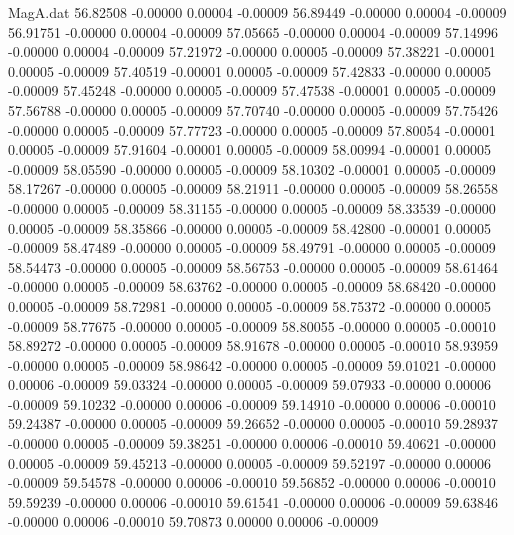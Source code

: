 \begin{filecontents}{MagA.dat}
  56.82508   -0.00000    0.00004   -0.00009
  56.89449   -0.00000    0.00004   -0.00009
  56.91751   -0.00000    0.00004   -0.00009
  57.05665   -0.00000    0.00004   -0.00009
  57.14996   -0.00000    0.00004   -0.00009
  57.21972   -0.00000    0.00005   -0.00009
  57.38221   -0.00001    0.00005   -0.00009
  57.40519   -0.00001    0.00005   -0.00009
  57.42833   -0.00000    0.00005   -0.00009
  57.45248   -0.00000    0.00005   -0.00009
  57.47538   -0.00001    0.00005   -0.00009
  57.56788   -0.00000    0.00005   -0.00009
  57.70740   -0.00000    0.00005   -0.00009
  57.75426   -0.00000    0.00005   -0.00009
  57.77723   -0.00000    0.00005   -0.00009
  57.80054   -0.00001    0.00005   -0.00009
  57.91604   -0.00001    0.00005   -0.00009
  58.00994   -0.00001    0.00005   -0.00009
  58.05590   -0.00000    0.00005   -0.00009
  58.10302   -0.00001    0.00005   -0.00009
  58.17267   -0.00000    0.00005   -0.00009
  58.21911   -0.00000    0.00005   -0.00009
  58.26558   -0.00000    0.00005   -0.00009
  58.31155   -0.00000    0.00005   -0.00009
  58.33539   -0.00000    0.00005   -0.00009
  58.35866   -0.00000    0.00005   -0.00009
  58.42800   -0.00001    0.00005   -0.00009
  58.47489   -0.00000    0.00005   -0.00009
  58.49791   -0.00000    0.00005   -0.00009
  58.54473   -0.00000    0.00005   -0.00009
  58.56753   -0.00000    0.00005   -0.00009
  58.61464   -0.00000    0.00005   -0.00009
  58.63762   -0.00000    0.00005   -0.00009
  58.68420   -0.00000    0.00005   -0.00009
  58.72981   -0.00000    0.00005   -0.00009
  58.75372   -0.00000    0.00005   -0.00009
  58.77675   -0.00000    0.00005   -0.00009
  58.80055   -0.00000    0.00005   -0.00010
  58.89272   -0.00000    0.00005   -0.00009
  58.91678   -0.00000    0.00005   -0.00010
  58.93959   -0.00000    0.00005   -0.00009
  58.98642   -0.00000    0.00005   -0.00009
  59.01021   -0.00000    0.00006   -0.00009
  59.03324   -0.00000    0.00005   -0.00009
  59.07933   -0.00000    0.00006   -0.00009
  59.10232   -0.00000    0.00006   -0.00009
  59.14910   -0.00000    0.00006   -0.00010
  59.24387   -0.00000    0.00005   -0.00009
  59.26652   -0.00000    0.00005   -0.00010
  59.28937   -0.00000    0.00005   -0.00009
  59.38251   -0.00000    0.00006   -0.00010
  59.40621   -0.00000    0.00005   -0.00009
  59.45213   -0.00000    0.00005   -0.00009
  59.52197   -0.00000    0.00006   -0.00009
  59.54578   -0.00000    0.00006   -0.00010
  59.56852   -0.00000    0.00006   -0.00010
  59.59239   -0.00000    0.00006   -0.00010
  59.61541   -0.00000    0.00006   -0.00009
  59.63846   -0.00000    0.00006   -0.00010
  59.70873    0.00000    0.00006   -0.00009

\end{filecontents}
